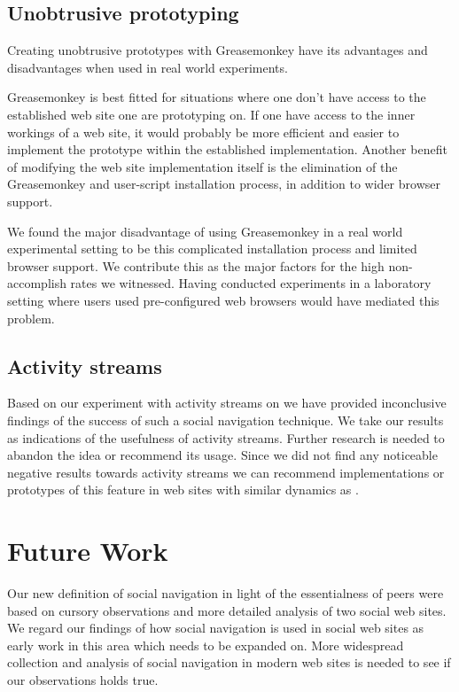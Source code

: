 \subsection{Unobtrusive prototyping}

Creating unobtrusive prototypes with Greasemonkey have its advantages and
disadvantages when used in real world experiments.

Greasemonkey is best fitted for situations where one don't have access to the
established web site one are prototyping on. If one have access to the inner
workings of a web site, it would probably be more efficient and easier to
implement the prototype within the established implementation. Another benefit
of modifying the web site implementation itself is the elimination of the
Greasemonkey and user-script installation process, in addition to wider
browser support.

We found the major disadvantage of using Greasemonkey in a real world
experimental setting to be this complicated installation process and limited
browser support. We contribute this as the major factors for the high
non-accomplish rates we witnessed. Having conducted experiments in a
laboratory setting where users used pre-configured web browsers would have
mediated this problem.

\subsection{Activity streams}

Based on our experiment with activity streams on \urort{} we have provided
inconclusive findings of the success of such a social navigation technique.
We take our results as indications of the usefulness of activity streams.
Further research is needed to abandon the idea or recommend its usage.
Since we did not find any noticeable negative results towards activity streams
we can recommend implementations or prototypes of this feature in web sites
with similar dynamics as \urort{}.

\section{Future Work}

Our new definition of social navigation in light of the essentialness of peers
were based on cursory observations and more detailed analysis of two social
web sites. We regard our findings of how social navigation is used in social
web sites as early work in this area which needs to be expanded on. More
widespread collection and analysis of social navigation in modern web sites is
needed to see if our observations holds true.

